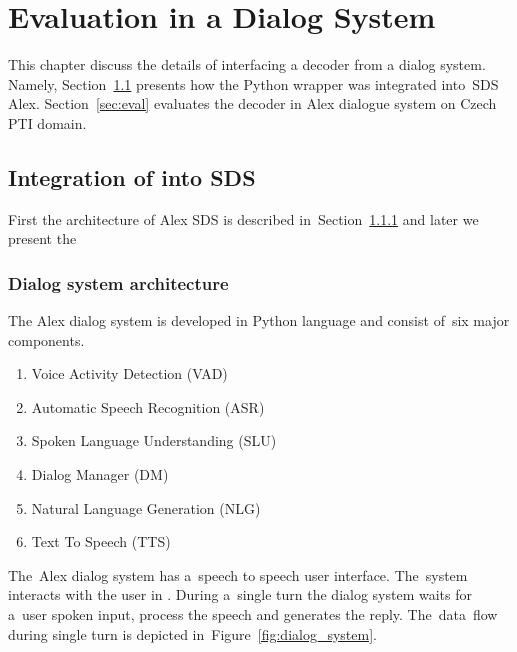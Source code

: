 \chapter{Evaluation in a Dialog System}
\label{cha:integration}





This chapter discuss the details of interfacing a decoder from a dialog system.
Namely, Section~\ref{sec:asrsds} presents how the Python wrapper  was integrated into~\ac{SDS} Alex.
Section~\ref{sec:eval} evaluates the decoder in Alex dialogue system on Czech \ac{PTI} domain. 


\section[ASR integration into SDS]{Integration of  into \ac{SDS}}
\label{sec:asrsds}
First the architecture of Alex \ac{SDS} is described in~Section~\ref{sec:arch}
and later we present the 

\subsection{Dialog system architecture} 
\label{sec:arch}
The Alex dialog system is developed in Python language and consist of~six major components. 
\begin{enumerate}
    \item Voice Activity Detection (VAD)
    \item Automatic Speech Recognition (ASR) 
    \item Spoken Language Understanding (SLU)
    \item Dialog Manager (DM)
    \item Natural Language Generation (NLG)
    \item Text To Speech (TTS)
\end{enumerate}
The~Alex dialog system has a~speech to speech user interface. The~system interacts with the user in . During a~single turn the dialog system waits for a~user spoken input, process the speech and generates the reply.
The~data~flow during single turn is depicted in~Figure~\ref{fig:dialog_system}.


